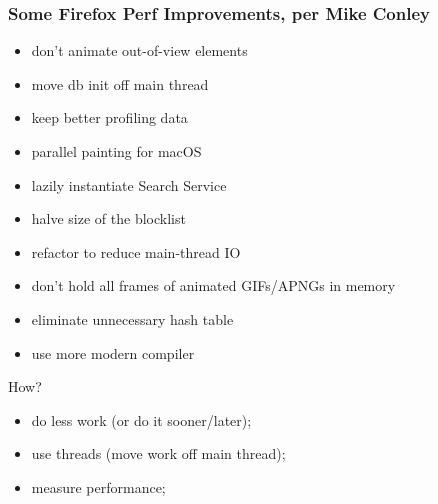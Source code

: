 \begin{frame}[fragile]
\frametitle{Some Firefox Perf Improvements, per Mike Conley}

\begin{minipage}{.5\textwidth}
\begin{itemize}
\item don't animate out-of-view elements
\item move db init off main thread
\item keep better profiling data
\item parallel painting for macOS
\item lazily instantiate Search Service
\end{itemize}
\end{minipage}\begin{minipage}{.5\textwidth}
\begin{itemize}
\item halve size of the blocklist
\item refactor to reduce main-thread IO
\item don't hold all frames of animated GIFs/APNGs in memory
\item eliminate unnecessary hash table
\item use more modern compiler
\end{itemize}
\end{minipage}

\begin{center}
\begin{minipage}{.6\textwidth}
\large How?
\begin{itemize}
\item do less work (or do it sooner/later);
\item use threads (move work off main thread);
\item measure performance;
\end{itemize}
\end{minipage}
\end{center}

\end{frame}

